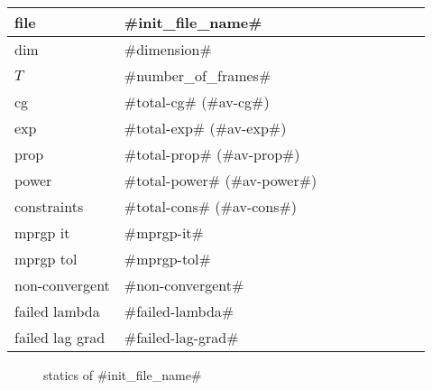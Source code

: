 \begin{center}
  \begin{tabular}{|l*{8}{|l}}
    \hline
	file & #init_file_name# \\ \hline
	dim & #dimension# \\ \hline
	$T$ & #number_of_frames# \\ \hline
	cg & #total-cg# (#av-cg#) \\ \hline
	exp & #total-exp# (#av-exp#) \\ \hline
	prop & #total-prop# (#av-prop#) \\ \hline
	power & #total-power# (#av-power#) \\ \hline
    constraints & #total-cons# (#av-cons#) \\ \hline
    mprgp it & #mprgp-it# \\ \hline
	mprgp tol & #mprgp-tol# \\ \hline
    non-convergent & #non-convergent# \\ \hline
    failed lambda & #failed-lambda# \\ \hline
    failed lag grad & #failed-lag-grad# \\ \hline
  \end{tabular}
\end{center}


\begin{figure}
  \centering
  \caption{statics of #init_file_name#}
  \label{en_f}
\end{figure}
